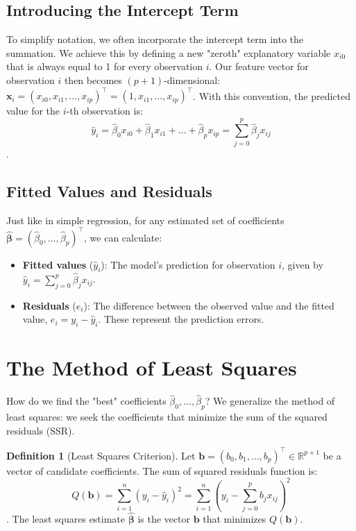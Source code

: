 \documentclass[11pt, letterpaper]{article}
\theoremstyle{definition}
\newtheorem{definition}{Definition}[section]
\newcommand{\R}{\mathbb{R}}
\newcommand{\vect}[1]{\mathbf{#1}} %
\begin{document}
\subsection{Introducing the Intercept Term}

To simplify notation, we often incorporate the intercept term into the summation. We achieve this by defining a new "zeroth" explanatory variable $x_{i0}$ that is always equal to 1 for every observation $i$. Our feature vector for observation $i$ then becomes $(p+1)$-dimensional: $\vect{x}_i = (x_{i0}, x_{i1}, \dots, x_{ip})^{\top} = (1, x_{i1}, \dots, x_{ip})^{\top}$. With this convention, the predicted value for the $i$-th observation is:
\[
\hat{y}_i = \hat{\beta}_0 x_{i0} + \hat{\beta}_1 x_{i1} + \dots + \hat{\beta}_p x_{ip} = \sum_{j=0}^{p} \hat{\beta}_j x_{ij}
\].

\subsection{Fitted Values and Residuals}

Just like in simple regression, for any estimated set of coefficients $\hat{\vect{\beta}} = (\hat{\beta}_0, \dots, \hat{\beta}_p)^{\top}$, we can calculate:
\begin{itemize}
    \item \textbf{Fitted values} ($\hat{y}_i$): The model's prediction for observation $i$, given by $\hat{y}_i = \sum_{j=0}^{p} \hat{\beta}_j x_{ij}$.
    \item \textbf{Residuals} ($e_i$): The difference between the observed value and the fitted value, $e_i = y_i - \hat{y}_i$. These represent the prediction errors.
\end{itemize}

\section{The Method of Least Squares}

How do we find the "best" coefficients $\hat{\beta}_0, \dots, \hat{\beta}_p$? We generalize the method of least squares: we seek the coefficients that minimize the sum of the squared residuals (SSR).

\begin{definition}[Least Squares Criterion]
Let $\vect{b} = (b_0, b_1, \dots, b_p)^{\top} \in \R^{p+1}$ be a vector of candidate coefficients. The sum of squared residuals function is:
\[
Q(\vect{b}) = \sum_{i=1}^{n} (y_i - \hat{y}_i)^2 = \sum_{i=1}^{n} \left( y_i - \sum_{j=0}^{p} b_j x_{ij} \right)^2
\]. The least squares estimate $\hat{\vect{\beta}}$ is the vector $\vect{b}$ that minimizes $Q(\vect{b})$.
\end{definition}
\end{document}
